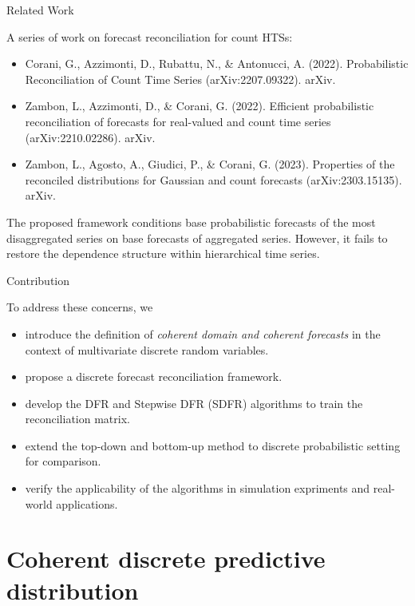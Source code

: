 \documentclass[12pt]{beamer}
\begin{document}
\begin{frame}{Related Work}

A series of work on forecast reconciliation for count HTSs:

\begin{itemize}
    \fontsize{9}{10.2}\selectfont
    \item Corani, G., Azzimonti, D., Rubattu, N., \& Antonucci, A. (2022). Probabilistic Reconciliation of Count Time Series (arXiv:2207.09322). arXiv.
    \item Zambon, L., Azzimonti, D., \& Corani, G. (2022). Efficient probabilistic reconciliation of forecasts for real-valued and count time series (arXiv:2210.02286). arXiv.
    \item Zambon, L., Agosto, A., Giudici, P., \& Corani, G. (2023). Properties of the reconciled distributions for Gaussian and count forecasts (arXiv:2303.15135). arXiv.
\end{itemize}

The proposed framework conditions base probabilistic forecasts of the most disaggregated series on base forecasts of aggregated series. However, it fails to restore the dependence structure within hierarchical time series.

\end{frame}

\begin{frame}{Contribution}

To address these concerns, we 

\begin{itemize}
    \item introduce the definition of \textit{coherent domain and coherent forecasts} in the context of multivariate discrete random variables.
    \item propose a discrete forecast reconciliation framework.
    \item develop the DFR and Stepwise DFR (SDFR) algorithms to train the reconciliation matrix.
    \item extend the top-down and bottom-up method to discrete probabilistic setting for comparison.
    \item verify the applicability of the algorithms in simulation expriments and real-world applications.
\end{itemize}

\end{frame}



\section{Coherent discrete predictive distribution}
\end{document}
